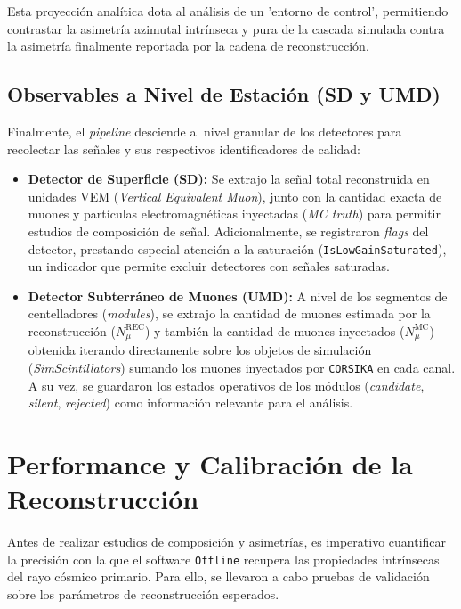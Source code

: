 \vspace{5cm}

Esta proyección analítica dota al análisis de un 'entorno de control', permitiendo contrastar la asimetría azimutal intrínseca y pura de la cascada simulada contra la asimetría finalmente reportada por la cadena de reconstrucción.

\subsection{Observables a Nivel de Estación (SD y UMD)}
Finalmente, el \textit{pipeline} desciende al nivel granular de los detectores para recolectar las señales y sus respectivos identificadores de calidad:
\begin{itemize}
	\item \textbf{Detector de Superficie (SD):} Se extrajo la señal total reconstruida en unidades VEM (\textit{Vertical Equivalent Muon}), junto con la cantidad exacta de muones y partículas electromagnéticas inyectadas (\textit{MC truth}) para permitir estudios de composición de señal. Adicionalmente, se registraron \textit{flags} del detector, prestando especial atención a la saturación (\texttt{IsLowGainSaturated}), un indicador que permite excluir detectores con señales saturadas.
	\item \textbf{Detector Subterráneo de Muones (UMD):} A nivel de los segmentos de centelladores (\textit{modules}), se extrajo la cantidad de muones estimada por la reconstrucción ($N_{\mu}^{\mathrm{REC}}$) y también la cantidad de muones inyectados ($N_{\mu}^{\mathrm{MC}}$) obtenida iterando directamente sobre los objetos de simulación (\textit{SimScintillators}) sumando los muones inyectados por \texttt{CORSIKA} en cada canal. A su vez, se guardaron los estados operativos de los módulos (\textit{candidate}, \textit{silent}, \textit{rejected}) como información relevante para el análisis.
\end{itemize}

\section{Performance y Calibración de la Reconstrucción}
\label{sec:performance_reconstruccion}

Antes de realizar estudios de composición y asimetrías, es imperativo cuantificar la precisión con la que el software \texttt{Offline} recupera las propiedades intrínsecas del rayo cósmico primario. Para ello, se llevaron a cabo pruebas de validación sobre los parámetros de reconstrucción esperados.

